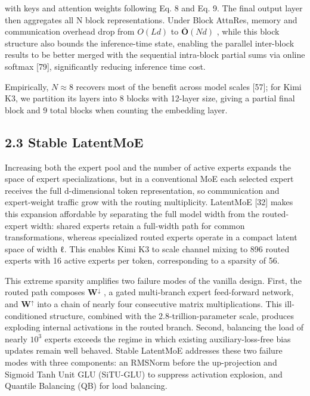 \documentclass[
  10
]{article}
\begin{document}
with keys and attention weights following Eq. 8 and Eq. 9. The final
output layer then aggregates all N block representations. Under Block
AttnRes, memory and communication overhead drop from \(O ( L d )\) to
\(\bar { \boldsymbol { O } } ( N d )\) , while this block structure also
bounds the inference-time state, enabling the parallel inter-block
results to be better merged with the sequential intra-block partial sums
via online softmax {[}79{]}, significantly reducing inference time cost.

Empirically, \(N \approx { 8 }\) recovers most of the benefit across
model scales {[}57{]}; for Kimi K3, we partition its layers into 8
blocks with 12-layer size, giving a partial final block and 9 total
blocks when counting the embedding layer.

\subsection{2.3 Stable LatentMoE}\label{stable-latentmoe}

Increasing both the expert pool and the number of active experts expands
the space of expert specializations, but in a conventional MoE each
selected expert receives the full d-dimensional token representation, so
communication and expert-weight traffic grow with the routing
multiplicity. LatentMoE {[}32{]} makes this expansion affordable by
separating the full model width from the routed-expert width: shared
experts retain a full-width path for common transformations, whereas
specialized routed experts operate in a compact latent space of width ℓ.
This enables Kimi K3 to scale channel mixing to 896 routed experts with
16 active experts per token, corresponding to a sparsity of 56.

This extreme sparsity amplifies two failure modes of the vanilla design.
First, the routed path composes \(\mathbf { W } ^ { \downarrow }\) , a
gated multi-branch expert feed-forward network, and
\(\mathbf { W } ^ { \uparrow }\) into a chain of nearly four consecutive
matrix multiplications. This ill-conditioned structure, combined with
the 2.8-trillion-parameter scale, produces exploding internal
activations in the routed branch. Second, balancing the load of nearly
\(1 0 ^ { 3 }\) experts exceeds the regime in which existing
auxiliary-loss-free bias updates remain well behaved. Stable LatentMoE
addresses these two failure modes with three components: an RMSNorm
before the up-projection and Sigmoid Tanh Unit GLU (SiTU-GLU) to
suppress activation explosion, and Quantile Balancing (QB) for load
balancing.
\end{document}

